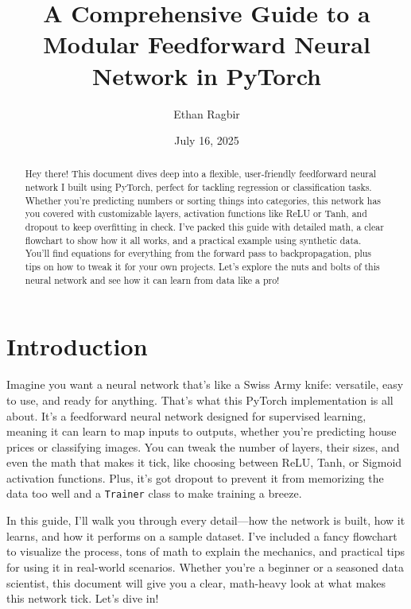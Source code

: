 \documentclass[11pt, a4paper]{article}
\title{A Comprehensive Guide to a Modular Feedforward Neural Network in PyTorch}
\author{Ethan Ragbir}
\date{July 16, 2025}
\begin{document}
\maketitle

\tableofcontents

\begin{abstract}
Hey there! This document dives deep into a flexible, user-friendly feedforward neural network I built using PyTorch, perfect for tackling regression or classification tasks. Whether you're predicting numbers or sorting things into categories, this network has you covered with customizable layers, activation functions like ReLU or Tanh, and dropout to keep overfitting in check. I’ve packed this guide with detailed math, a clear flowchart to show how it all works, and a practical example using synthetic data. You’ll find equations for everything from the forward pass to backpropagation, plus tips on how to tweak it for your own projects. Let’s explore the nuts and bolts of this neural network and see how it can learn from data like a pro!
\end{abstract}

\section{Introduction}
Imagine you want a neural network that’s like a Swiss Army knife: versatile, easy to use, and ready for anything. That’s what this PyTorch implementation is all about. It’s a feedforward neural network designed for supervised learning, meaning it can learn to map inputs to outputs, whether you’re predicting house prices or classifying images. You can tweak the number of layers, their sizes, and even the math that makes it tick, like choosing between ReLU, Tanh, or Sigmoid activation functions. Plus, it’s got dropout to prevent it from memorizing the data too well and a \texttt{Trainer} class to make training a breeze.

In this guide, I’ll walk you through every detail—how the network is built, how it learns, and how it performs on a sample dataset. I’ve included a fancy flowchart to visualize the process, tons of math to explain the mechanics, and practical tips for using it in real-world scenarios. Whether you’re a beginner or a seasoned data scientist, this document will give you a clear, math-heavy look at what makes this network tick. Let’s dive in!
\end{document}
